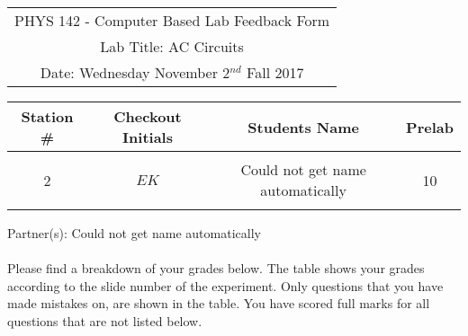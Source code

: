\documentclass{article}
\begin{document}

\clearpage\begin{table}[h]
	\centering
	\begin{tabular}{c}
	PHYS 142 - Computer Based Lab Feedback Form\\
	Lab Title: AC Circuits\\Date: Wednesday November 2$^{nd}$ Fall 2017 \\\hline
\end{tabular}
\end{table}
\begin{table}[h]\centering \begin{tabular}{|c|c|p{9.9 cm}|c|}\hline Station \#  & Checkout Initials & \multicolumn{1}{|c|}{Students Name} & Prelab \\\hline\multirow{3}{*}{2}& \multirow{3}{*}{$EK$} & &\\& &\multicolumn{1}{|c|}{Could not get name automatically}&10\\&   &  &\\\hline
\end{tabular}
\end{table}
Partner(s): Could not get name automatically\\
\\Please find a breakdown of your grades below. The table shows your grades according to the slide number of the experiment. Only questions that you have made mistakes on, are shown in the table. You have scored full marks for all questions that are not listed below.
\end{document}
